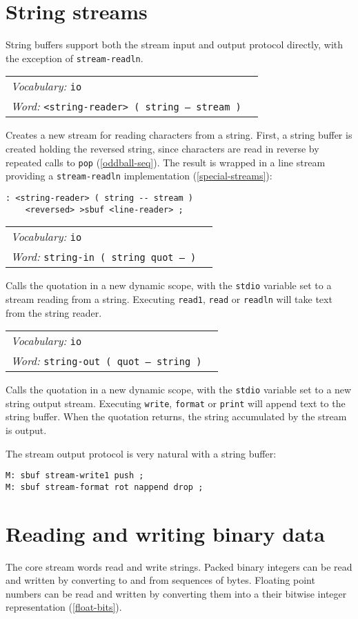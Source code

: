 \documentclass{book}
\newcommand{\vocabulary}[1]{\emph{Vocabulary:} \texttt{#1}&\\}
\newcommand{\ordinaryword}[2]{\index{\texttt{#1}}\emph{Word:} \texttt{#2}&\\}
\newcommand{\wordtable}[1]{


\begin{tabularx}{12cm}{lX}
\hline
#1
\hline
\end{tabularx}

}
\begin{document}
\section{String streams}\label{string-streams}

String buffers support both the stream input and output protocol directly, with the exception of \verb|stream-readln|.

\wordtable{
\vocabulary{io}
\ordinaryword{<string-reader>}{<string-reader> ( string -- stream )}
}
Creates a new stream for reading characters from a string. First, a string buffer is created holding the reversed string, since characters are read in reverse by repeated calls to \verb|pop| (\ref{oddball-seq}). The result is wrapped in a line stream providing a \verb|stream-readln| implementation (\ref{special-streams}):
\begin{verbatim}
: <string-reader> ( string -- stream )
    <reversed> >sbuf <line-reader> ;
\end{verbatim}

\wordtable{
\vocabulary{io}
\ordinaryword{string-in}{string-in ( string quot -- )}
}
Calls the quotation in a new dynamic scope, with the \texttt{stdio} variable set to a stream reading from a string. Executing \texttt{read1}, \texttt{read} or \texttt{readln} will take text from the string reader.

\wordtable{
\vocabulary{io}
\ordinaryword{string-out}{string-out ( quot -- string )}
}
Calls the quotation in a new dynamic scope, with the \texttt{stdio} variable set to a new string output stream. Executing \texttt{write}, \texttt{format} or \texttt{print} will append text to the string buffer. When the quotation returns, the string accumulated by the stream is output.

The stream output protocol is very natural with a string buffer:
\begin{verbatim}
M: sbuf stream-write1 push ;
M: sbuf stream-format rot nappend drop ;
\end{verbatim}

\section{Reading and writing binary data}

The core stream words read and write strings. Packed binary integers can be read and written by converting to and from sequences of bytes. Floating point numbers can be read and written by converting them into a their bitwise integer representation (\ref{float-bits}).
\end{document}
